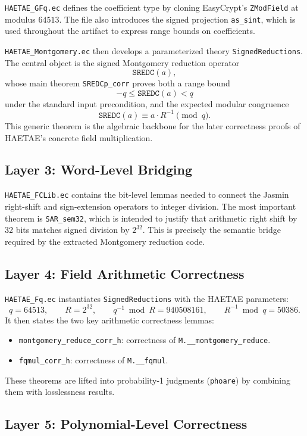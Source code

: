 \documentclass[11pt]{article}
\newcommand{\file}[1]{\texttt{#1}}
\newcommand{\ec}[1]{\texttt{#1}}
\begin{document}
\file{HAETAE\_GFq.ec} defines the coefficient type by cloning EasyCrypt's
\ec{ZModField} at modulus $64513$. The file also introduces the signed
projection \ec{as\_sint}, which is used throughout the artifact to express
range bounds on coefficients.

\file{HAETAE\_Montgomery.ec} then develops a parameterized theory
\ec{SignedReductions}. The central object is the signed Montgomery reduction
operator
\[
\ec{SREDC}(a),
\]
whose main theorem \ec{SREDCp\_corr} proves both a range bound
\[
-q \le \ec{SREDC}(a) < q
\]
under the standard input precondition, and the expected modular congruence
\[
\ec{SREDC}(a) \equiv a \cdot R^{-1} \pmod q.
\]
This generic theorem is the algebraic backbone for the later correctness proofs
of HAETAE's concrete field multiplication.

\subsection{Layer 3: Word-Level Bridging}

\file{HAETAE\_FCLib.ec} contains the bit-level lemmas needed to connect the
Jasmin right-shift and sign-extension operators to integer division. The most
important theorem is \ec{SAR\_sem32}, which is intended to justify that
arithmetic right shift by 32 bits matches signed division by $2^{32}$. This is
precisely the semantic bridge required by the extracted Montgomery reduction
code.

\subsection{Layer 4: Field Arithmetic Correctness}

\file{HAETAE\_Fq.ec} instantiates \ec{SignedReductions} with the HAETAE
parameters:
\[
q = 64513,\qquad R = 2^{32},\qquad q^{-1} \bmod R = 940508161,\qquad
R^{-1} \bmod q = 50386.
\]
It then states the two key arithmetic correctness lemmas:
\begin{itemize}[leftmargin=1.5em]
\item \ec{montgomery\_reduce\_corr\_h}: correctness of
      \ec{M.\_\_montgomery\_reduce}.
\item \ec{fqmul\_corr\_h}: correctness of \ec{M.\_\_fqmul}.
\end{itemize}
These theorems are lifted into probability-1 judgments
(\ec{phoare}) by combining them with losslessness results.

\subsection{Layer 5: Polynomial-Level Correctness}
\end{document}
